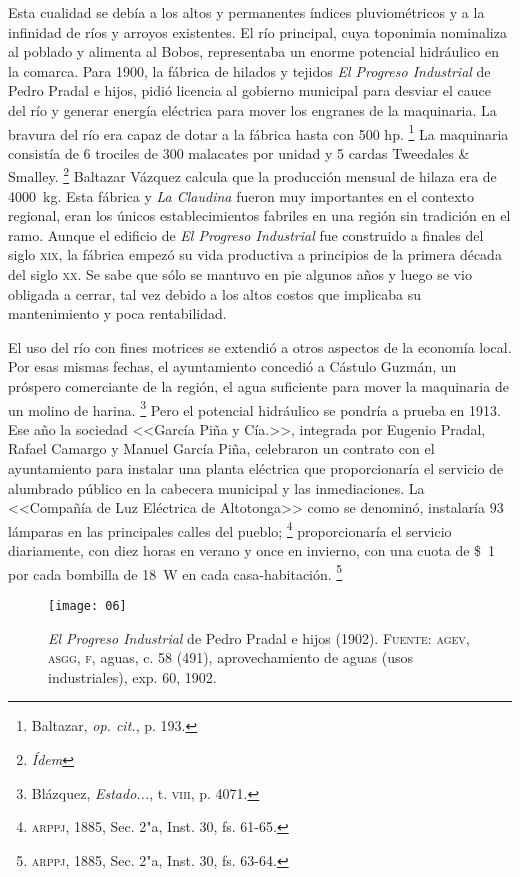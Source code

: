 \documentclass[14pt,twoside,final]{extbook} %
\let\oldfootnote\footnote
\renewcommand\footnote[1]{%
\oldfootnote{\hspace{1mm}#1}}
\begin{document}
Esta cualidad se debía a los altos y permanentes índices pluviométricos y a la infinidad de ríos y arroyos existentes. El río principal, cuya toponimia nominaliza al poblado y alimenta al Bobos, representaba un enorme potencial hidráulico en la comarca. Para 1900, la fábrica de hilados y tejidos \emph{El Progreso Industrial} de Pedro Pradal e hijos, pidió licencia al gobierno municipal para desviar el cauce del río y generar energía eléctrica para mover los engranes de la maquinaria. La bravura del río era capaz de dotar a la fábrica hasta con 500 hp.\footnote{Baltazar, \emph{op. cit.}, p. 193.} La maquinaria consistía de 6 trociles de 300 malacates por unidad y 5 cardas Tweedales \& Smalley.\footnote{\em Ídem} Baltazar Vázquez calcula que la producción mensual de hilaza era de 4000~kg. Esta fábrica y \emph{La Claudina} fueron muy importantes en el contexto regional, eran los únicos establecimientos fabriles en una región sin tradición en el ramo. Aunque el edificio de \emph{El Progreso Industrial} fue construido a finales del siglo \textsc{xix}, la fábrica empezó su vida productiva a principios de la primera década del siglo \textsc{xx}. Se sabe que sólo se mantuvo en pie algunos años y luego se vio obligada a cerrar, tal vez debido a los altos costos que implicaba su mantenimiento y poca rentabilidad.

El uso del río con fines motrices se extendió a otros aspectos de la economía local. Por esas mismas fechas, el ayuntamiento concedió a Cástulo Guzmán, un próspero comerciante de la región, el agua suficiente para mover la maquinaria de un molino de harina.\footnote{Blázquez, \emph{Estado...}, t. \textsc{viii}, p. 4071.} Pero el potencial hidráulico se pondría a prueba en 1913. Ese año la sociedad <<García Piña y Cía.>>, integrada por Eugenio Pradal, Rafael Camargo y Manuel García Piña, celebraron un contrato con el ayuntamiento para instalar una planta eléctrica que proporcionaría el servicio de alumbrado público en la cabecera municipal y las inmediaciones. La <<Compañía de Luz Eléctrica de Altotonga>> como se denominó, instalaría 93 lámparas en las principales calles del pueblo;\footnote{\textsc{arppj}, 1885, Sec. 2"a, Inst. 30, fs. 61-65.} proporcionaría el servicio diariamente, con diez horas en verano y once en invierno, con una cuota de \$~1 por cada bombilla de 18~W en cada casa-habitación.\footnote{\textsc{arppj}, 1885, Sec. 2"a, Inst. 30, fs. 63-64.}
\begin{sidewaysfigure}
\centering
\texttt{[image: 06]}
\caption[\emph{El Progreso Industrial} de Pedro Pradal e hijos (1902)]{\emph{El Progreso Industrial} de Pedro Pradal e hijos (1902). \textsc{Fuente:} \textsc{agev, asgg, f}, aguas, c. 58 (491), aprovechamiento de aguas (usos industriales), exp. 60, 1902.}
\label{fig:progreso-industrial}
\end{sidewaysfigure}
\end{document}
